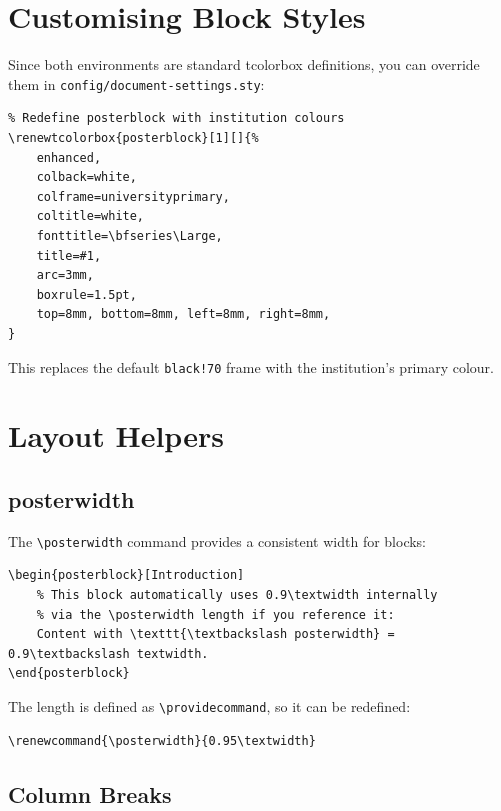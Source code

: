 \section{Customising Block Styles}

Since both environments are standard tcolorbox definitions, you can override
them in \texttt{config/document-settings.sty}:

\begin{verbatim}
% Redefine posterblock with institution colours
\renewtcolorbox{posterblock}[1][]{%
    enhanced,
    colback=white,
    colframe=universityprimary,
    coltitle=white,
    fonttitle=\bfseries\Large,
    title=#1,
    arc=3mm,
    boxrule=1.5pt,
    top=8mm, bottom=8mm, left=8mm, right=8mm,
}
\end{verbatim}

This replaces the default \texttt{black!70} frame with the institution's
primary colour.

\section{Layout Helpers}

\subsection{posterwidth}

The \texttt{\textbackslash posterwidth} command provides a consistent width
for blocks:

\begin{verbatim}
\begin{posterblock}[Introduction]
    % This block automatically uses 0.9\textwidth internally
    % via the \posterwidth length if you reference it:
    Content with \texttt{\textbackslash posterwidth} = 0.9\textbackslash textwidth.
\end{posterblock}
\end{verbatim}

The length is defined as \texttt{\textbackslash providecommand}, so it can be
redefined:

\begin{verbatim}
\renewcommand{\posterwidth}{0.95\textwidth}
\end{verbatim}

\subsection{Column Breaks}

